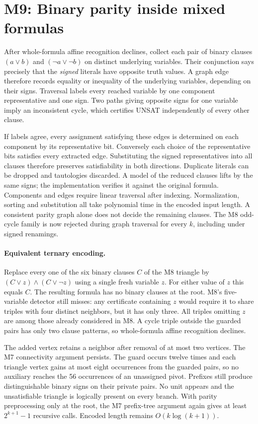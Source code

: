 \documentclass[11pt,a4paper]{article}
\begin{document}
\section{M9: Binary parity inside mixed formulas}
After whole-formula affine recognition declines, collect each pair of
binary clauses $(a\lor b)$ and $(\neg a\lor\neg b)$ on distinct
underlying variables. Their conjunction says precisely that the
\emph{signed} literals have opposite truth values. A graph edge
therefore records equality or inequality of the underlying variables,
depending on their signs. Traversal labels every reached variable by
one component representative and one sign. Two paths giving opposite
signs for one variable imply an inconsistent cycle, which certifies
UNSAT independently of every other clause.

If labels agree, every assignment satisfying these edges is determined
on each component by its representative bit. Conversely each choice of
the representative bits satisfies every extracted edge. Substituting
the signed representatives into all clauses therefore preserves
satisfiability in both directions. Duplicate literals can be dropped
and tautologies discarded. A model of the reduced clauses lifts by
the same signs; the implementation verifies it against the original
formula. Components and edges require linear traversal after indexing.
Normalization, sorting and substitution all take polynomial time in
the encoded input length. A consistent parity graph alone does not
decide the remaining clauses. The M8 odd-cycle family is now rejected
during graph traversal for every $k$, including under signed renamings.

\paragraph{Equivalent ternary encoding.}
Replace every one of the six binary clauses $C$ of the M8 triangle
by $(C\lor z)\land(C\lor\neg z)$ using a single fresh variable $z$.
For either value of $z$ this equals $C$. The resulting formula has
no binary clauses at the root. M8's five-variable detector still
misses: any certificate containing $z$ would require it to share
triples with four distinct neighbors, but it has only three.
All triples omitting $z$ are among those already considered in M8.
A cycle triple outside the guarded pairs has only two clause patterns,
so whole-formula affine recognition declines.

The added vertex retains a neighbor after removal of at most two
vertices. The M7 connectivity argument persists. The guard occurs
twelve times and each triangle vertex gains at most eight occurrences
from the guarded pairs, so no auxiliary reaches the 56 occurrences
of an unassigned pivot. Prefixes still produce distinguishable binary
signs on their private pairs. No unit appears and the unsatisfiable
triangle is logically present on every branch. With parity preprocessing
only at the root, the M7 prefix-tree argument again gives at least
$2^{k+1}-1$ recursive calls. Encoded length remains $O(k\log(k+1))$.
\end{document}
